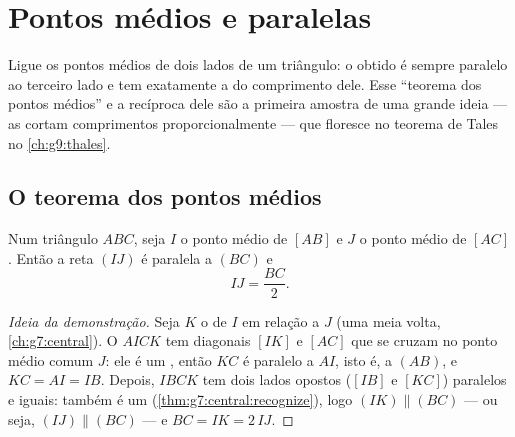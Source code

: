 \chapter{Pontos médios e paralelas}\label{ch:g8:midpoints}

Ligue os pontos médios de dois lados de um triângulo: o  obtido
é sempre paralelo ao terceiro lado e tem exatamente a  do
comprimento dele. Esse ``teorema dos pontos médios'' e a recíproca dele
são a primeira amostra de uma grande ideia --- as  cortam
comprimentos proporcionalmente --- que floresce no teorema de Tales no
\cref{ch:g9:thales}.

\section{O teorema dos pontos médios}

\begin{theorem}\label{thm:g8:midpoints:direct}
Num triângulo $ABC$, seja $I$ o ponto médio de $[AB]$ e $J$ o ponto
médio de $[AC]$. Então a reta $(IJ)$ é paralela a $(BC)$ e
\[
IJ = \frac{BC}{2} .
\]
\end{theorem}

\begin{proof}[Ideia da demonstração]
Seja $K$ o  de $I$ em relação a $J$ (uma meia volta,
\cref{ch:g7:central}). O  $AICK$ tem diagonais $[IK]$ e
$[AC]$ que se cruzam no ponto médio comum $J$: ele é um ,
então $KC$ é paralelo a $AI$, isto é, a $(AB)$, e $KC = AI = IB$.
Depois, $IBCK$ tem dois lados opostos ($[IB]$ e $[KC]$) paralelos e
iguais: também é um 
(\cref{thm:g7:central:recognize}), logo $(IK) \parallel (BC)$ --- ou
seja, $(IJ) \parallel (BC)$ --- e $BC = IK = 2\,IJ$.
\end{proof}

